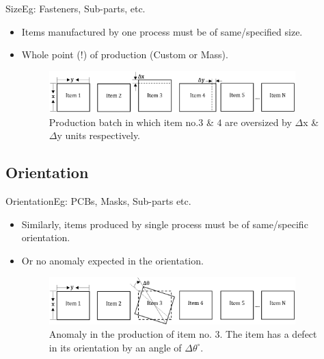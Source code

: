 \documentclass{beamer}
\begin{document}
\begin{frame}{Size}{Eg: Fasteners, Sub-parts, etc.}
  \begin{itemize}
  \item { Items manufactured by one process must be of same/specified size.
        \pause }
  \item Whole point (!) of production (Custom or Mass).

  \begin{figure}
    \includegraphics[width=0.9\textwidth]{size}
    \caption{Production batch in which item no.$3$ \& $4$ are oversized by $\Delta$x \& $\Delta$y units respectively.}
    \label{fig:size_line}
  \end{figure}

  \end{itemize}
\end{frame}

\subsection{Orientation}

\begin{frame}{Orientation}{Eg: PCBs, Masks, Sub-parts etc.}
  \begin{itemize}
  \item Similarly, items produced by single process must be of same/specific orientation.
  \item Or no anomaly expected in the orientation.
  \begin{figure}
    \includegraphics[width=0.9\textwidth]{orientation}
    \caption{Anomaly in the production of item no. $3$. The item has a defect in its orientation by an angle of $\Delta\theta^\circ$.}
    \label{fig:orientation_line}
  \end{figure}
  \end{itemize}
\end{frame}
\end{document}
